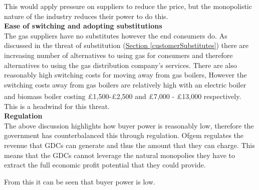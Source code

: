 \documentclass[11pt]{article}		%
\newcommand{\supercite}[1]{\textsuperscript{\cite{#1}}}		%
\newcommand{\sectref}[1]{\hyperref[#1]{Section \ref*{#1}}}     %
\begin{document}
                This would apply pressure on suppliers to reduce the price, but the monopolistic nature of the industry reduces their power to do this.
                \\
                \textbf{Ease of switching and adopting substitutions}
                \\
                The gas suppliers have no substitutes however the end consumers do. As discussed in the threat of substitution (\sectref{customerSubstitutes}) there are increasing number of alternatives to using gas for consumers and therefore alternatives to using the gas distribution company’s services. %
                There are also reasonably high switching costs for moving away from gas boilers, 
                However the switching costs away from gas boilers are relatively high with an electric boiler and biomass boiler costing £1,500-£2,500  and £7,000 - £13,000 respectively.\supercite{boiler_cost}  This is a headwind for this threat.
                \\
                \textbf{Regulation}
                \\
                The above discussion highlights how buyer power is reasonably low, therefore the government has counterbalanced this through regulation. Ofgem regulates the revenue that GDCs can generate and thus the amount that they can charge. This means that the GDCs cannot leverage the natural monopolies they have to extract the full economic profit potential that they could provide.
                
                From this it can be seen that buyer power is low.
                 
                
                
            
\end{document}
